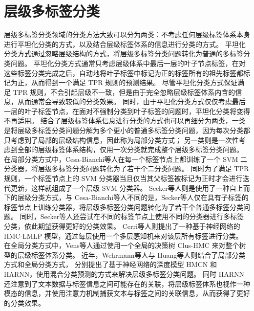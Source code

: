 \section{层级多标签分类}
    层级多标签分类领域的分类方法大致可以分为两类：不考虑任何层级标签体系本身进行平坦化分类的方式，以及结合层级标签体系的信息进行分类的方式。
    平坦化分类方式通过忽略层级结构的方式，将层级多标签分类问题转化为普通的多标签分类问题。
    平坦化分类方式通常只考虑层级体系中最后一层的叶子节点标签，在对这些标签分类完成之后，自动地将叶子标签中标记为正的标签所有的祖先标签都标记为正，从而得到一个满足 TPR 规则的预测结果。
    尽管平坦化分类方式保证满足 TPR 规则，不会引起层级不一致，但是由于完全忽略层级标签体系内含的信息，从而通常会导致较低的分类效果。
    同时，由于平坦化分类方式仅仅考虑最后一层的叶子标签节点，在面对不强制分类到叶子标签的问题时，平坦化分类将变得不再适用\cite{Silla2010ASO}。
    结合了层级标签体系信息进行分类的方式也可以再细分为两类，一类是将层级多标签分类问题分解为多个更小的普通多标签分类问题，因为每次分类都只考虑到了局部的层级结构信息，因此称为局部分类方式；
    另一类则是一次性考虑到全部的层级标签体系结构，仅用一次分类就完成整个层级多标签分类问题。
    在局部分类方式中，Cesa-Bianchi等人\cite{CesaBianchi2004IncrementalAF}在每一个标签节点上都训练了一个 SVM 二分类器，将层级多标签分类问题转化为了若干个二分类问题。
    同时为了满足 TPR 规则，一个标签节点上的 SVM 分类器当且仅当其父标签被标记为正时才会进行迭代更新，这样就组成了一个层级 SVM 分类器。
    Secker等人\cite{Secker2007AnEC}则是使用了一种自上而下的层级分类方式，与 Cesa-Bianchi等人不同的是，Secker等人仅在具有子标签的标签节点上训练分类器，将层级多标签分类问题转化为了若干个普通多标签分类问题。
    同时，Secker等人还尝试在不同的标签节点上使用不同的分类器进行多标签分类，依此期望获得更好的分类效果。
    Cerri等人\cite{Cerri2016ReductionSF}则提出了一种基于神经网络的 HMC-LMLP 模型，通过每层使用一个多层感知机来对该层所有标签进行分类。
    在全局分类方式中，Vens等人\cite{Vens2008DecisionTF}通过使用一个全局的决策树 Clus-HMC 来对整个树型的层级标签体系分类。
    近年，Wehrmann等人\cite{Wehrmann2018HierarchicalMC}与 Huang等人\cite{Huang2019HierarchicalMT}则结合了局部分类方式和全局分类方式，
    分别提出了基于神经网络的深度模型 HMCN 和 HARNN，使用混合分类预测的方式来解决层级多标签分类问题。
    同时 HARNN 还注意到了文本数据与标签信息之间可能存在的关联，将层级标签体系也视作一种模态的信息，并使用注意力机制捕获文本与标签之间的关联信息，从而获得了更好的分类效果。
